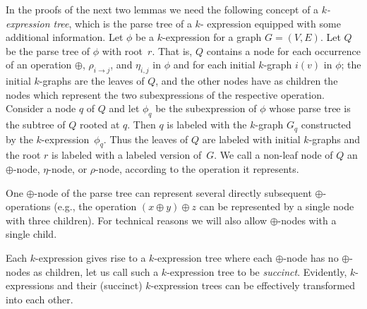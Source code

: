 \documentclass[10pt,usletter]{article}
\theoremstyle{remark}
\newcommand{\hy}{\hbox{-}\nobreak\hskip0pt}
\begin{document}
In the proofs of the next two lemmas we need the following concept of
a \emph{$k$\hy expression tree}, which is the parse tree of a $k$\hy
expression equipped with some additional information.  Let $\phi$ be a
$k$\hy expression for a graph $G=(V,E)$.  Let $Q$ be the parse tree of
$\phi$ with root~$r$.  That is, $Q$ contains a node for each occurrence
of an operation $\oplus$, $\rho_{i \rightarrow j}$, and $\eta_{i,j}$
in $\phi$ and for each initial $k$\hy graph $i(v)$ in $\phi$; the
initial $k$\hy graphs are the leaves of $Q$, and the other nodes have
as children the nodes which represent the two subexpressions of the
respective operation.  Consider a node $q$ of $Q$ and let $\phi_q$ be
the subexpression of $\phi$ whose parse tree is the subtree of $Q$
rooted at $q$. Then $q$ is labeled with the $k$\hy graph $G_q$
constructed by the $k$\hy expression~$\phi_q$.  Thus the leaves of $Q$
are labeled with initial $k$\hy graphs and the root $r$ is labeled
with a labeled version of~$G$.  We call a non-leaf node of $Q$ an
$\oplus$\hy node, $\eta$\hy node, or $\rho$\hy node, according to the
operation it represents.


One $\oplus$\hy node of the parse tree can represent several directly
subsequent $\oplus$\hy operations (e.g., the operation $(x \oplus y)
\oplus z$ can be represented by a single node with three children).
For technical reasons we will also allow $\oplus$\hy nodes with a
single child.

Each $k$\hy expression gives rise to a $k$\hy expression tree where
each $\oplus$\hy node has no $\oplus$\hy nodes as children, let us
call such a $k$\hy expression tree to be \emph{succinct}.  Evidently,
$k$\hy expressions and their (succinct) $k$\hy expression trees can be
effectively transformed into each other.
\end{document}
